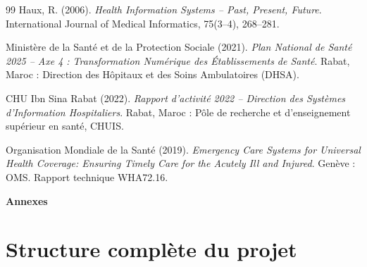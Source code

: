 \documentclass[12pt,a4paper]{report}
\begin{document}
\begin{thebibliography}{99}
		Haux, R. (2006). \textit{Health Information Systems -- Past, Present, Future}.
		International Journal of Medical Informatics, 75(3--4), 268--281.
		
		Ministère de la Santé et de la Protection Sociale (2021).
		\textit{Plan National de Santé 2025 -- Axe 4 : Transformation Numérique des
			Établissements de Santé}. Rabat, Maroc : Direction des Hôpitaux et des Soins
		Ambulatoires (DHSA).
		
		CHU Ibn Sina Rabat (2022). \textit{Rapport d'activité 2022 -- Direction des
			Systèmes d'Information Hospitaliers}. Rabat, Maroc : Pôle de recherche et
		d'enseignement supérieur en santé, CHUIS.
		
		Organisation Mondiale de la Santé (2019). \textit{Emergency Care Systems for
			Universal Health Coverage: Ensuring Timely Care for the Acutely Ill and Injured}.
		Genève : OMS. Rapport technique WHA72.16.
		
	\end{thebibliography}
	
	\clearpage
	{\noindent\normalfont\fontsize{14}{16}\selectfont\bfseries\color{bleuMain}Annexes\par}
	\vspace{12pt}
	
	\section{Structure complète du projet}
	
\end{document}
